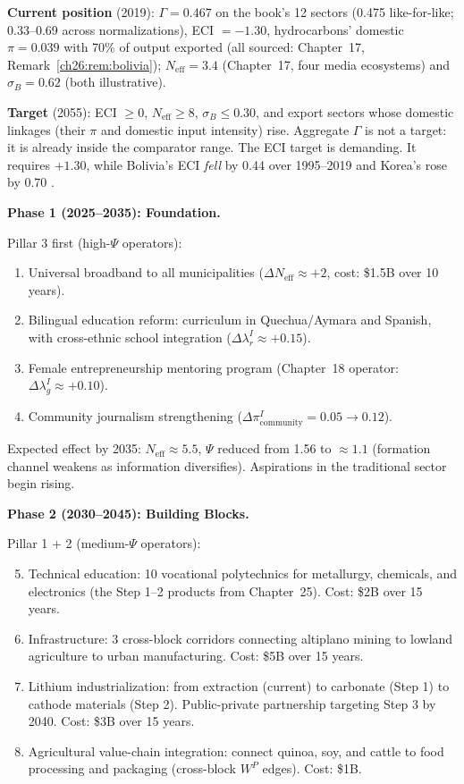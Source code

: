 \documentclass[../structural_economics_book.tex]{subfiles}
\begin{document}
\begin{example}\label{ch26:ex:plan}

\textbf{Current position} (2019): $\Gamma = 0.467$ on the book's 12 sectors (0.475 like-for-like; 0.33--0.69 across normalizations), ECI $= -1.30$, hydrocarbons' domestic $\pi = 0.039$ with 70\% of output exported (all sourced: Chapter~17, Remark~\ref{ch26:rem:bolivia}); $N_{\text{eff}} = 3.4$ (Chapter~17, four media ecosystems) and $\sigma_B = 0.62$ (both illustrative).

\textbf{Target} (2055): ECI $\geq 0$, $N_{\text{eff}} \geq 8$, $\sigma_B \leq 0.30$, and export sectors whose domestic linkages (their $\pi$ and domestic input intensity) rise. Aggregate $\Gamma$ is not a target: it is already inside the comparator range. The ECI target is demanding. It requires $+1.30$, while Bolivia's ECI \emph{fell} by 0.44 over 1995--2019 and Korea's rose by 0.70 \citep{growthlab2026atlas}.

\textbf{Phase 1 (2025--2035): Foundation.}

Pillar 3 first (high-$\Psi$ operators):
\begin{enumerate}
\item Universal broadband to all municipalities ($\Delta N_{\text{eff}} \approx +2$, cost: \$1.5B over 10 years).
\item Bilingual education reform: curriculum in Quechua/Aymara and Spanish, with cross-ethnic school integration ($\Delta\lambda_r^I \approx +0.15$).
\item Female entrepreneurship mentoring program (Chapter~18 operator: $\Delta\lambda_g^I \approx +0.10$).
\item Community journalism strengthening ($\Delta\pi^I_{\text{community}} = 0.05 \to 0.12$).
\end{enumerate}

Expected effect by 2035: $N_{\text{eff}} \approx 5.5$, $\Psi$ reduced from 1.56 to $\approx 1.1$ (formation channel weakens as information diversifies). Aspirations in the traditional sector begin rising.

\textbf{Phase 2 (2030--2045): Building Blocks.}

Pillar 1 + 2 (medium-$\Psi$ operators):
\begin{enumerate}
\setcounter{enumi}{4}
\item Technical education: 10 vocational polytechnics for metallurgy, chemicals, and electronics (the Step 1--2 products from Chapter~25). Cost: \$2B over 15 years.
\item Infrastructure: 3 cross-block corridors connecting altiplano mining to lowland agriculture to urban manufacturing. Cost: \$5B over 15 years.
\item Lithium industrialization: from extraction (current) to carbonate (Step 1) to cathode materials (Step 2). Public-private partnership targeting Step 3 by 2040. Cost: \$3B over 15 years.
\item Agricultural value-chain integration: connect quinoa, soy, and cattle to food processing and packaging (cross-block $W^P$ edges). Cost: \$1B.
\end{enumerate}


\end{example}
\end{document}
